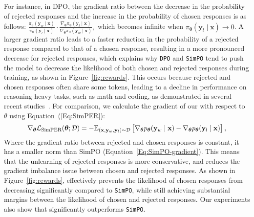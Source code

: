 For instance, in DPO, the gradient ratio between the decrease in the probability of rejected responses and the increase in the probability of chosen responses is as follows:
$
\frac{\pi_{\boldsymbol{\theta}}(\mathbf{y}_{w} \mid \mathbf{x})}{\pi_{\boldsymbol{\theta}}(\mathbf{y}_{l} \mid \mathbf{x})} \cdot \frac{\nabla_{\boldsymbol{\theta}} \pi_{\boldsymbol{\theta}}(\mathbf{y}_{l} \mid \mathbf{x})}{\nabla_{\boldsymbol{\theta}} \pi_{\boldsymbol{\theta}}(\mathbf{y}_{w} \mid \mathbf{x})},
$
which becomes infinite when $\pi_{\boldsymbol{\theta}}(\mathbf{y}_{l} \mid \mathbf{x}) \rightarrow 0$. A larger gradient ratio leads to a faster reduction in the probability of a rejected response compared to that of a chosen response, resulting in a more pronounced decrease for rejected responses,
which explains why \texttt{DPO} and \texttt{SimPO} tend to push the model to decrease the likelihood of both chosen and rejected responses during training, as shown in Figure~\ref{fig:rewards}. This occurs because rejected and chosen responses often share some tokens, leading to a decline in performance on reasoning-heavy tasks, such as math and coding, as demonstrated in several recent studies~\citep{meng2024simpo,pal2024smaug,pang2024iterative,chen2024noise}. For comparison, we calculate the gradient of our \method with respect to $\theta$ using Equation~(\ref{Eq:SimPER}):
\begin{align}
    \nabla_{\boldsymbol{\theta}} \mathcal{L}_{\rm{SimPER}}(\boldsymbol{\theta};\mathcal{D})=-\mathbb{E}_{(\mathbf{x},\mathbf{y}_{w},\mathbf{y}_{l})\sim \mathcal{D}}\left[ {\nabla_{\boldsymbol{\theta}} p_{\boldsymbol{\theta}}(\mathbf{y}_w \mid \mathbf{x})} - {\nabla_{\boldsymbol{\theta}} p_{\boldsymbol{\theta}}(\mathbf{y}_l \mid \mathbf{x})}  \right],
\end{align}
Where the gradient ratio between rejected and chosen responses is constant, it has a smaller norm than SimPO (Equation~\ref{Eq:SimPO-gradient}). This means that the unlearning of rejected responses is more conservative, and \method reduces the gradient imbalance issue between chosen and rejected responses. As shown in Figure~\ref{fig:rewards}, \method effectively prevents the likelihood of chosen responses from decreasing significantly compared to \texttt{SimPO}, while still achieving substantial margins between the likelihood of chosen and rejected responses. Our experiments also show that \method significantly outperforms \texttt{SimPO}.



